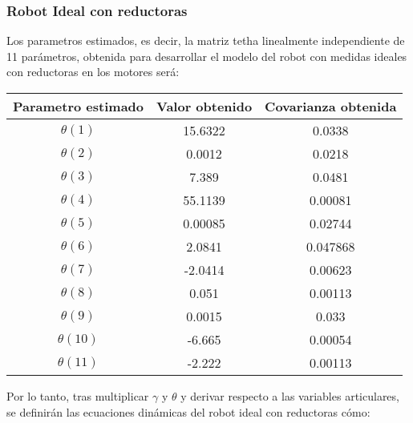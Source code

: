 	\subsubsection{Robot Ideal con reductoras}
	Los parametros estimados, es decir, la matriz tetha linealmente independiente de 11 parámetros, obtenida para desarrollar el modelo del robot con medidas ideales con reductoras en los motores será:
	\begin{center}
		\begin{tabular}{| c | c | c |}

			\hline
			Parametro estimado & Valor obtenido & Covarianza obtenida \\
			\hline
			$\theta(1) $ & 15.6322 & 0.0338 \\
			\hline
			$\theta(2) $ & 0.0012 & 0.0218 \\
			\hline
			$\theta(3) $ & 7.389 & 0.0481 \\
			\hline
			$\theta(4) $ & 55.1139 & 0.00081 \\
			\hline
			$\theta(5) $ & 0.00085 & 0.02744 \\
			\hline
			$\theta(6) $ & 2.0841 & 0.047868 \\
			\hline
			$\theta(7) $ & -2.0414 & 0.00623 \\
			\hline
			$\theta(8) $ & 0.051 & 0.00113 \\
			\hline
			$\theta(9) $ & 0.0015 & 0.033 \\
			\hline
			$\theta(10) $ & -6.665 & 0.00054 \\
			\hline
			$\theta(11) $ & -2.222 & 0.00113 \\
			\hline


		\end{tabular}
	\end{center}
Por lo tanto, tras multiplicar $\gamma$ y $\theta$ y derivar respecto a las variables articulares, se definirán las ecuaciones dinámicas del robot ideal con reductoras cómo:


